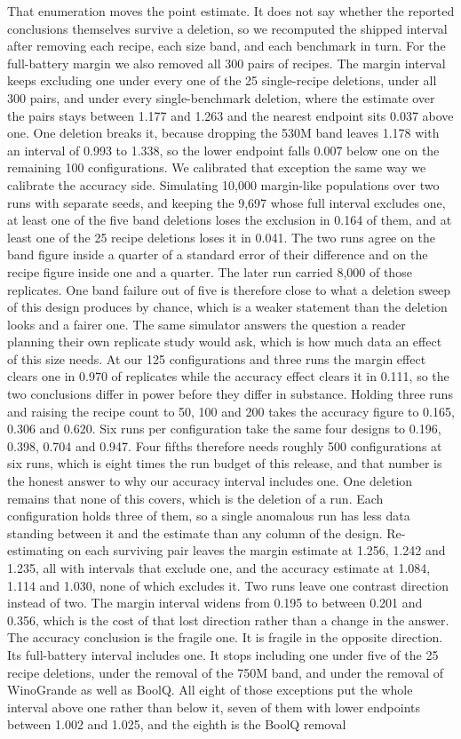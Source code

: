 That enumeration moves the point estimate. It does not say whether the reported conclusions themselves survive a deletion, so we recomputed the shipped interval after removing each recipe, each size band, and each benchmark in turn. For the full-battery margin we also removed all 300 pairs of recipes. The margin interval keeps excluding one under every one of the 25 single-recipe deletions, under all 300 pairs, and under every single-benchmark deletion, where the estimate over the pairs stays between 1.177 and 1.263 and the nearest endpoint sits 0.037 above one. One deletion breaks it, because dropping the 530M band leaves 1.178 with an interval of 0.993 to 1.338, so the lower endpoint falls 0.007 below one on the remaining 100 configurations. We calibrated that exception the same way we calibrate the accuracy side. Simulating 10,000 margin-like populations over two runs with separate seeds, and keeping the 9,697 whose full interval excludes one, at least one of the five band deletions loses the exclusion in 0.164 of them, and at least one of the 25 recipe deletions loses it in 0.041. The two runs agree on the band figure inside a quarter of a standard error of their difference and on the recipe figure inside one and a quarter. The later run carried 8,000 of those replicates. One band failure out of five is therefore close to what a deletion sweep of this design produces by chance, which is a weaker statement than the deletion looks and a fairer one. The same simulator answers the question a reader planning their own replicate study would ask, which is how much data an effect of this size needs. At our 125 configurations and three runs the margin effect clears one in 0.970 of replicates while the accuracy effect clears it in 0.111, so the two conclusions differ in power before they differ in substance. Holding three runs and raising the recipe count to 50, 100 and 200 takes the accuracy figure to 0.165, 0.306 and 0.620. Six runs per configuration take the same four designs to 0.196, 0.398, 0.704 and 0.947. Four fifths therefore needs roughly 500 configurations at six runs, which is eight times the run budget of this release, and that number is the honest answer to why our accuracy interval includes one. One deletion remains that none of this covers, which is the deletion of a run. Each configuration holds three of them, so a single anomalous run has less data standing between it and the estimate than any column of the design. Re-estimating on each surviving pair leaves the margin estimate at 1.256, 1.242 and 1.235, all with intervals that exclude one, and the accuracy estimate at 1.084, 1.114 and 1.030, none of which excludes it. Two runs leave one contrast direction instead of two. The margin interval widens from 0.195 to between 0.201 and 0.356, which is the cost of that lost direction rather than a change in the answer. The accuracy conclusion is the fragile one. It is fragile in the opposite direction. Its full-battery interval includes one. It stops including one under five of the 25 recipe deletions, under the removal of the 750M band, and under the removal of WinoGrande as well as BoolQ. All eight of those exceptions put the whole interval above one rather than below it, seven of them with lower endpoints between 1.002 and 1.025, and the eighth is the BoolQ removal 